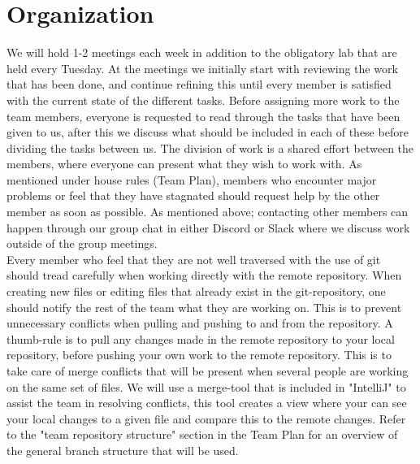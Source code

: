 \documentclass{article}
\begin{document}
    
    \section{Organization}
    \noindent
    We will hold 1-2 meetings each week in addition to the obligatory lab that are held every Tuesday. At the meetings we initially start with reviewing the work that has been done, and continue refining this until every member is satisfied with the current state of the different tasks. Before assigning more work to the team members, everyone is requested to read through the tasks that have been given to us, after this we discuss what should be included in each of these before dividing the tasks between us. The division of work is a shared effort between the members, where everyone can present what they wish to work with. As mentioned under house rules (Team Plan), members who encounter major problems or feel that they have stagnated should request help by the other member as soon as possible. As mentioned above; contacting other members can happen through our group chat in either Discord or Slack where we discuss work outside of the group meetings. \\

    \noindent
    Every member who feel that they are not well traversed with the use of git should tread carefully when working directly with the remote repository. When creating new files or editing files that already exist in the git-repository, one should notify the rest of the team what they are working on. This is to prevent unnecessary conflicts when pulling and pushing to and from the repository. A thumb-rule is to pull any changes made in the remote repository to your local repository, before pushing your own work to the remote repository. This is to take care of merge conflicts that will be present when several people are working on the same set of files. We will use a merge-tool that is included in "IntelliJ" to assist the team in resolving conflicts, this tool creates a view where your can see your local changes to a given file and compare this to the remote changes. Refer to the "team repository structure" section in the Team Plan for an overview of the general branch structure that will be used. \\
\end{document}
